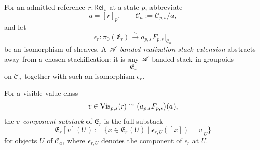 \begin{definition}\label{def:realization-stack-extension}
For an admitted reference $r:\mathsf{Ref}_s$ at a state $p$, abbreviate
\[
a=[r]_p,
\qquad
\mathcal C_a:=\mathcal C_{p,s}/a,
\]
and let
\[
\epsilon_r:\pi_0(\mathfrak E_r)\xrightarrow{\sim} a_{p,s}F_{p,s}|_{\mathcal C_a}
\]
be an isomorphism of sheaves. A \emph{$\mathscr{A}$-banded realization-stack extension} abstracts away from a chosen stackification: it is any $\mathscr{A}$-banded stack in groupoids
\[
\mathfrak E_r
\]
on $\mathcal C_a$ together with such an isomorphism $\epsilon_r$.

For a visible value class
\[
v\in \mathrm{Vis}_{p,s}(r)\cong \bigl(a_{p,s}F_{p,s}\bigr)(a),
\]
the \emph{$v$-component substack} of $\mathfrak E_r$ is the full substack
\[
\mathfrak E_r[v](U):=
\bigl\{x\in \mathfrak E_r(U)\mid \epsilon_{r,U}([x])=v|_U\bigr\}
\]
for objects $U$ of $\mathcal C_a$, where $\epsilon_{r,U}$ denotes the component of $\epsilon_r$ at $U$.
\end{definition}

